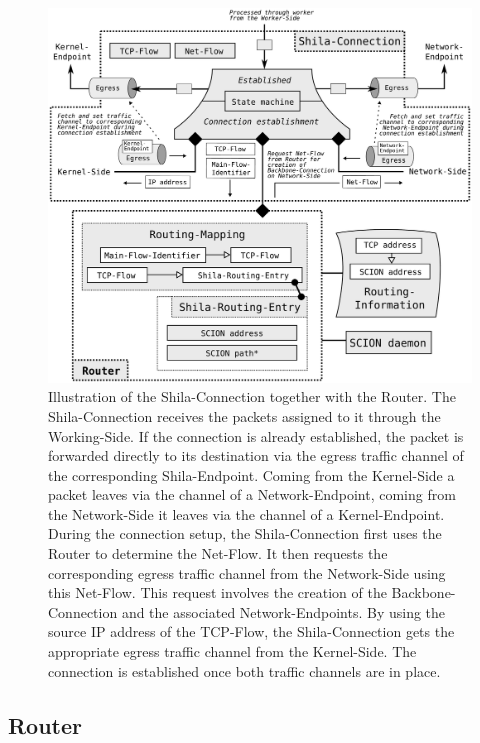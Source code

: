 \begin{figure}
	\begin{center}
		\def\svgwidth{1\textwidth}
		\includegraphics[scale=0.2]{../illustrations/implementation/PartsShilaConnection.pdf}   
		\caption[]{Illustration of the Shila-Connection together with the Router. The Shila-Connection receives the packets assigned to it through the Working-Side. If the connection is already established, the packet is forwarded directly to its destination via the egress traffic channel of the corresponding Shila-Endpoint. Coming from the Kernel-Side a packet leaves via the channel of a Network-Endpoint, coming from the Network-Side it leaves via the channel of a Kernel-Endpoint. During the connection setup, the Shila-Connection first uses the Router to determine the Net-Flow. It then requests the corresponding egress traffic channel from the Network-Side using this Net-Flow. This request involves the creation of the Backbone-Connection and the associated Network-Endpoints. By using the source IP address of the TCP-Flow, the Shila-Connection gets the appropriate egress traffic channel from the Kernel-Side. The connection is established once both traffic channels are in place.}
		\label{fig:ImplementationShilaConnection}
	\end{center}
\end{figure}

\subsection*{Router}
\label{sec:ImplementationRouter}

